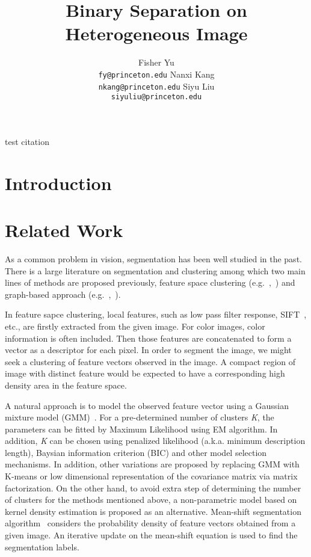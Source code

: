 \documentclass{article} %
\title{Binary Separation on Heterogeneous Image}
\author{
Fisher Yu \\
\texttt{fy@princeton.edu}
\And
Nanxi Kang \\
\texttt{nkang@princeton.edu} 
\And
Siyu Liu\\
\texttt{siyuliu@princeton.edu}
}
\begin{document}
\maketitle

test citation~\citep{Boykov2006graph}

\section{Introduction}
\section{Related Work}
As a common problem in vision, segmentation has been well studied in the past. There is a large literature on segmentation and clustering among which two main lines of methods are proposed previously, feature space clustering (e.g.~\citep{Comaniciu1997featurespace},~\citep{Comaniciu1999meanshift}) and graph-based approach (e.g.~\citep{Shi1997normalizedcuts},~\citep{Wu1993optimalgraph}). 

In feature sapce clustering, local features, such as low pass filter response, SIFT~\citep{Lowe2004sift}, etc., are firstly extracted from the given image. For color images, color information is often included. Then those features are concatenated to form a vector as a descriptor for each pixel. In order to segment the image, we might seek a clustering of feature vectors observed in the image. A compact region of image with distinct feature would be expected to have a corresponding high density area in the feature space. 

A natural approach is to model the observed feature vector using a Gaussian mixture model (GMM)~\citep{Carson2002bolbworld}. For a pre-determined number of clusters \textit{K}, the parameters can be fitted by Maximum Likelihood using EM algorithm. In addition, \textit{K} can be chosen using penalized likelihood (a.k.a. minimum description length), Baysian information criterion (BIC) and other model selection mechanisms. In addition, other variations are proposed by replacing GMM with K-means or low dimensional representation of the covariance matrix via matrix factorization. On the other hand, to avoid extra step of determining the number of clusters for the methods mentioned above, a non-parametric model based on kernel density estimation is proposed as an alternative. Mean-shift segmentation algorithm~\citep{Comaniciu2002robustapproach} considers the probability density of feature vectors obtained from a given image. An iterative update on the mean-shift equation is used to find the segmentation labels. 
\end{document}
